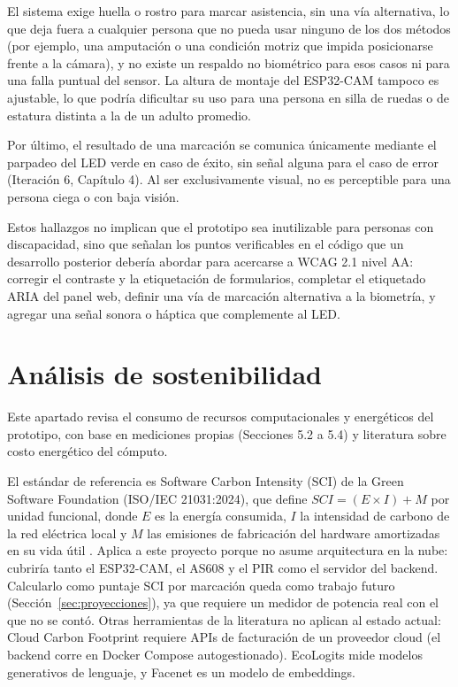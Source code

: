 \documentclass{iccmemoria}
\begin{document}
El sistema exige huella o rostro para marcar asistencia, sin una vía alternativa, lo que deja fuera a cualquier persona que no pueda usar ninguno de los dos métodos (por ejemplo, una amputación o una condición motriz que impida posicionarse frente a la cámara), y no existe un respaldo no biométrico para esos casos ni para una falla puntual del sensor. La altura de montaje del ESP32-CAM tampoco es ajustable, lo que podría dificultar su uso para una persona en silla de ruedas o de estatura distinta a la de un adulto promedio.

Por último, el resultado de una marcación se comunica únicamente mediante el parpadeo del LED verde en caso de éxito, sin señal alguna para el caso de error (Iteración 6, Capítulo 4). Al ser exclusivamente visual, no es perceptible para una persona ciega o con baja visión.

Estos hallazgos no implican que el prototipo sea inutilizable para personas con discapacidad, sino que señalan los puntos verificables en el código que un desarrollo posterior debería abordar para acercarse a WCAG 2.1 nivel AA: corregir el contraste y la etiquetación de formularios, completar el etiquetado ARIA del panel web, definir una vía de marcación alternativa a la biometría, y agregar una señal sonora o háptica que complemente al LED.

\section{Análisis de sostenibilidad}
Este apartado revisa el consumo de recursos computacionales y energéticos del prototipo, con base en mediciones propias (Secciones 5.2 a 5.4) y literatura sobre costo energético del cómputo.

El estándar de referencia es Software Carbon Intensity (SCI) de la Green Software Foundation (ISO/IEC 21031:2024), que define $SCI = (E \times I) + M$ por unidad funcional, donde $E$ es la energía consumida, $I$ la intensidad de carbono de la red eléctrica local y $M$ las emisiones de fabricación del hardware amortizadas en su vida útil \cite{gsf_sci}. Aplica a este proyecto porque no asume arquitectura en la nube: cubriría tanto el ESP32-CAM, el AS608 y el PIR como el servidor del backend. Calcularlo como puntaje SCI por marcación queda como trabajo futuro (Sección~\ref{sec:proyecciones}), ya que requiere un medidor de potencia real con el que no se contó. Otras herramientas de la literatura no aplican al estado actual: Cloud Carbon Footprint \cite{thoughtworks_ccf} requiere APIs de facturación de un proveedor cloud (el backend corre en Docker Compose autogestionado). EcoLogits \cite{genaiimpact_ecologits} mide modelos generativos de lenguaje, y Facenet es un modelo de embeddings.
\end{document}
